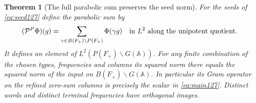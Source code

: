 \documentclass[a4paper,11pt]{article}
\newtheorem{theorem}[proposition]{Theorem}
\theoremstyle{definition}
\theoremstyle{remark}
\numberwithin{equation}{section}
\begin{document}
\begin{theorem}[The full parabolic sum preserves the seed norm]
\label{thm:parabolic129}
For the seeds of \eqref{eq:seed127} define the parabolic sum by
\begin{equation}
      (\mathcal P^{P}\Phi)(g)
       =\sum_{\gamma\in B(F_+)\backslash P(F_+)}\Phi(\gamma g)
            \quad\hbox{in }L^2\hbox{ along the unipotent quotient}.
       \label{eq:sum129}
\end{equation}
It defines an element of \(L^2(P(F_+)\backslash G(\mathbb A))\).
For any finite combination of the chosen types, frequencies and
columns its squared norm there equals the squared norm of the
input on \(B(F_+)\backslash G(\mathbb A)\). In particular its
Gram operator on the refined zero-sum columns is precisely the
scalar in \eqref{eq:main127}. Distinct words and distinct terminal
frequencies have orthogonal images.
\end{theorem}
\end{document}
